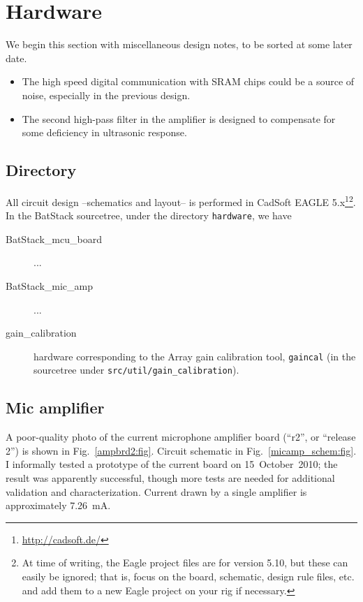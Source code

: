 \documentclass[letterpaper]{article}
\begin{document}
\section{Hardware}
\label{hardware:sec}

We begin this section with miscellaneous design notes, to be sorted at
some later date.
\begin{itemize}
\item The high speed digital communication with SRAM chips could be a
  source of noise, especially in the previous design.

\item The second high-pass filter in the amplifier is designed to
  compensate for some deficiency in ultrasonic response.
\end{itemize}

\subsection{Directory}

All circuit design --schematics and layout-- is performed in CadSoft
EAGLE 5.x\footnote{\url{http://cadsoft.de/}}\footnote{At time of
  writing, the Eagle project files are for version 5.10, but these can
  easily be ignored; that is, focus on the board, schematic, design
  rule files, etc. and add them to a new Eagle project on your rig if
  necessary.}. In the BatStack sourcetree, under the directory
\texttt{hardware}, we have
\begin{description}
\item[BatStack\_mcu\_board] ...

\item[BatStack\_mic\_amp] ...

\item[gain\_calibration] hardware corresponding to the Array gain
  calibration tool, \texttt{gaincal} (in the sourcetree under
  \texttt{src/util/gain\_calibration}).
\end{description}


\subsection{Mic amplifier}

A poor-quality photo of the current microphone amplifier board
(``r2'', or ``release 2'') is shown in Fig.~\ref{ampbrd2:fig}. Circuit
schematic in Fig.~\ref{micamp_schem:fig}. I informally tested a
prototype of the current board on 15~October~2010; the result was
apparently successful, though more tests are needed for additional
validation and characterization. Current drawn by a single amplifier
is approximately 7.26~mA.
\end{document}
